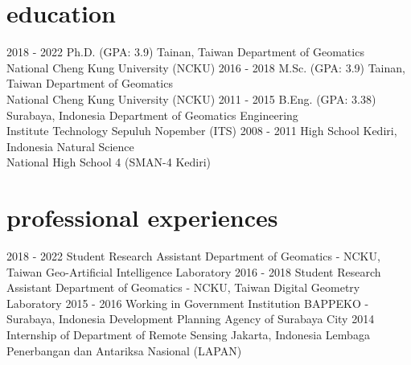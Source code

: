 \documentclass[icon]{mycvtemplate}
\begin{document}
\section{education}

\begin{TableTemplate}
  \TableTemplateItem
    {2018 - 2022}
    {Ph.D. (GPA: 3.9)}
    {Tainan, Taiwan}
    {Department of Geomatics\\ National Cheng Kung University (NCKU)}
  \TableTemplateItem
    {2016 - 2018}
    {M.Sc. (GPA: 3.9)}
    {Tainan, Taiwan}
    {Department of Geomatics\\ National Cheng Kung University (NCKU)}
  \TableTemplateItem
    {2011 - 2015}
    {B.Eng. (GPA: 3.38)}
    {Surabaya, Indonesia}
    {Department of Geomatics Engineering\\ Institute Technology Sepuluh Nopember (ITS)}
  \TableTemplateItem
    {2008 - 2011}
    {High School}
    {Kediri, Indonesia}
    {Natural Science\\ National High School 4 (SMAN-4 Kediri)}
\end{TableTemplate}


\section{professional experiences}
\begin{TableTemplate}
  \TableTemplateItem
    {2018 - 2022}
    {Student Research Assistant}
    {Department of Geomatics - NCKU, Taiwan}
    {Geo-Artificial Intelligence Laboratory}
  \TableTemplateItem
    {2016 - 2018}
    {Student Research Assistant}
    {Department of Geomatics - NCKU, Taiwan}
    {Digital Geometry Laboratory}
\TableTemplateItem
    {2015 - 2016}
    {Working in Government Institution}
    {BAPPEKO - Surabaya, Indonesia}
    {Development Planning Agency of Surabaya City}
\TableTemplateItem
    {2014}
    {Internship of Department of Remote Sensing}
    {Jakarta, Indonesia}
    {Lembaga Penerbangan dan Antariksa Nasional (LAPAN)}
\end{TableTemplate}
\end{document}
